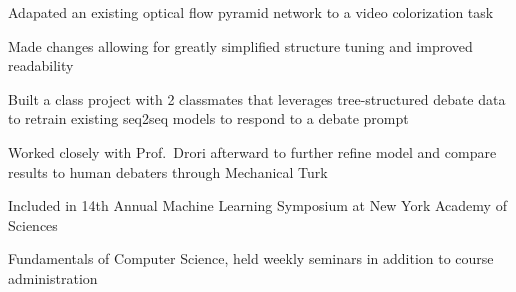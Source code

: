 \documentclass[letterpaper]{deedy-resume} %
\begin{document}
\begin{minipage}[t]{0.66\textwidth}


\begin{tightitemize}
    \item Adapated an existing optical flow pyramid network to a video colorization task
    \item Made changes allowing for greatly simplified structure tuning and improved readability
\end{tightitemize}

\sectionspace %



\begin{tightitemize}
  \item Built a class project with 2 classmates that leverages tree-structured debate data to retrain existing seq2seq models to respond to a debate prompt
  \item Worked closely with Prof.\ Drori afterward to further refine model and compare results to human debaters through Mechanical Turk
  \item Included in 14th Annual Machine Learning Symposium at New York Academy of Sciences
\end{tightitemize}

\sectionspace %



\begin{tightitemize}
    \item Fundamentals of Computer Science, held weekly seminars in addition to course administration
\end{tightitemize}

\sectionspace %



\end{minipage}
\end{document}
